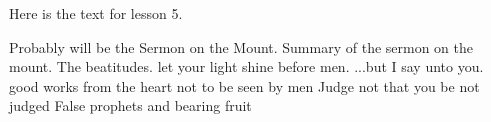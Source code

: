 Here is the text for lesson 5.

Probably will be the Sermon on the Mount.
Summary of the sermon on the mount.
The beatitudes.
let your light shine before men.
...but I say unto you.
good works from the heart not to be seen by men
Judge not that you be not judged
False prophets and bearing fruit
